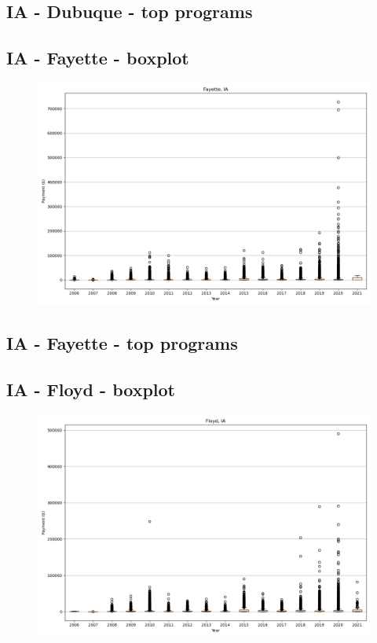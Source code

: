 \subsection*{IA - Dubuque - top programs}

\newpage
\subsection*{IA - Fayette - boxplot}
\begin{figure}[h]
\centering
\includegraphics[width=7in]{../output/boxplots/counties/Fayette-IA_boxplot.png}
\end{figure}


\subsection*{IA - Fayette - top programs}

\newpage
\subsection*{IA - Floyd - boxplot}
\begin{figure}[h]
\centering
\includegraphics[width=7in]{../output/boxplots/counties/Floyd-IA_boxplot.png}
\end{figure}


